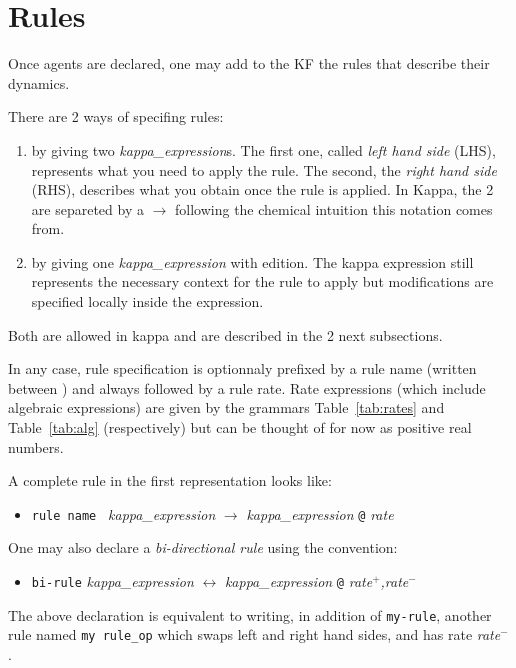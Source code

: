 \documentclass[11pt]{book}
\def\ttt#1{\texttt{#1}}
\def\var#1{{\textquotesingle}#1{\textquotesingle}}
\def\rar{\rightarrow}
\def\lrar{\leftrightarrow}
\def\ITE#1{\begin{itemize}#1\end{itemize}}
\def\imp#1{\emph{#1}\index{#1}}
\begin{document}
\section{Rules}\label{sec:rules}

Once agents are declared, one may add to the KF the
rules that describe their dynamics.

There are 2 ways of specifing rules:
\begin{enumerate}
  \item by giving two {\it kappa\_expression}s. The first one, called
    \emph{left hand side} (LHS), represents what
    you need to apply the rule. The second, the \emph{right hand
      side} (RHS), describes what you obtain
    once the rule is applied. In Kappa, the 2 are separeted by a
    $\rar$ following the chemical intuition this notation comes from.
  \item by giving one {\it kappa\_expression} with edition. The kappa
    expression still represents the necessary context for the rule to
    apply but modifications are specified locally inside the expression.
\end{enumerate}

Both are allowed in kappa and are described in the 2 next subsections.

In any case, rule specification is optionnaly prefixed by a rule name
(written between \textquotesingle) and always followed by a rule rate.
Rate expressions (which include algebraic expressions) are given by the grammars Table~\ref{tab:rates} and
Table~\ref{tab:alg} (respectively) but can be thought of for now as
positive real numbers.

A complete rule in the first representation looks like:

\ITE{
\item[] \ttt{{\textquotesingle}rule name{\textquotesingle} } {\it
  kappa\_expression} $\rar$ {\it kappa\_expression} \ttt{@} {\it rate}
}

One may also
declare a \imp{bi-directional rule} using the convention:

\ITE{
\item[] \ttt{{\textquotesingle}bi-rule{\textquotesingle}} {\it kappa\_expression} $\lrar$ {\it kappa\_expression} \ttt{@} {\it rate$^+$,rate$^-$}
}

The above declaration is equivalent to
writing, in addition of \ttt{\var{my-rule}}, another rule named
\ttt{\var{my rule\_op}} which swaps left and right hand sides, and has
rate \textit{rate$^-$}.
\end{document}
